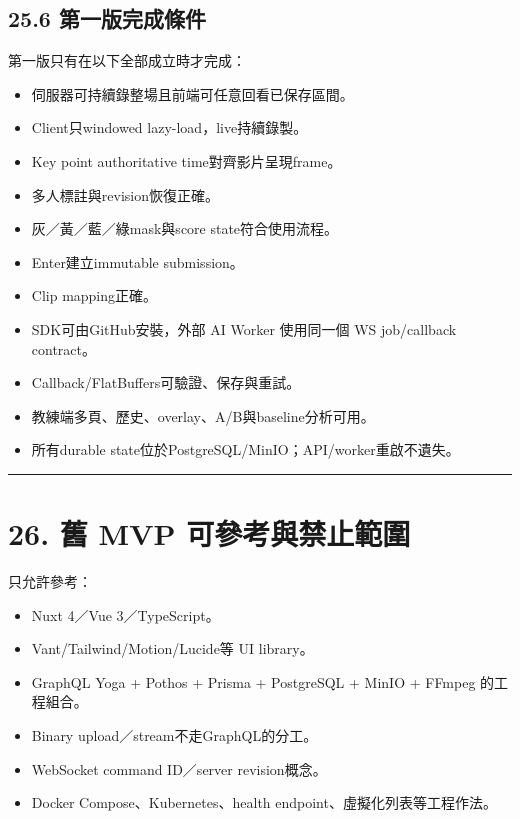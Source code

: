 \documentclass[
  9pt,
  a4paper,
]{article}
\providecommand{\tightlist}{%
  \setlength{\itemsep}{0pt}\setlength{\parskip}{0pt}}
\begin{document}
\subsection{25.6
第一版完成條件}\label{256-ux7b2cux4e00ux7248ux5b8cux6210ux689dux4ef6}

第一版只有在以下全部成立時才完成：

\begin{itemize}
\tightlist
\item
  伺服器可持續錄整場且前端可任意回看已保存區間。
\item
  Client只windowed lazy-load，live持續錄製。
\item
  Key point authoritative time對齊影片呈現frame。
\item
  多人標註與revision恢復正確。
\item
  灰／黃／藍／綠mask與score state符合使用流程。
\item
  Enter建立immutable submission。
\item
  Clip mapping正確。
\item
  SDK可由GitHub安裝，外部 AI Worker 使用同一個 WS job/callback contract。
\item
  Callback/FlatBuffers可驗證、保存與重試。
\item
  教練端多頁、歷史、overlay、A/B與baseline分析可用。
\item
  所有durable state位於PostgreSQL/MinIO；API/worker重啟不遺失。
\end{itemize}

\begin{center}\rule{0.5\linewidth}{0.5pt}\end{center}

\section{26. 舊 MVP
可參考與禁止範圍}\label{26-ux820a-mvp-ux53efux53c3ux8003ux8207ux7981ux6b62ux7bc4ux570d}

只允許參考：

\begin{itemize}
\tightlist
\item
  Nuxt 4／Vue 3／TypeScript。
\item
  Vant/Tailwind/Motion/Lucide等 UI library。
\item
  GraphQL Yoga + Pothos + Prisma + PostgreSQL + MinIO + FFmpeg
  的工程組合。
\item
  Binary upload／stream不走GraphQL的分工。
\item
  WebSocket command ID／server revision概念。
\item
  Docker Compose、Kubernetes、health endpoint、虛擬化列表等工程作法。
\end{itemize}
\end{document}
